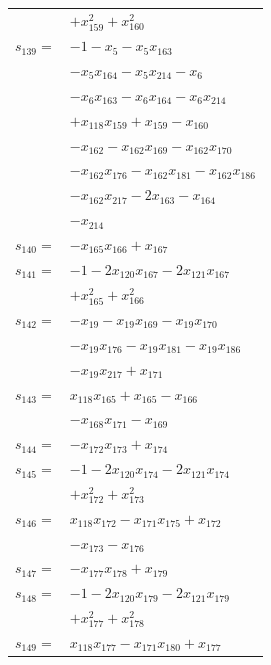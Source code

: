 \begin{longtable}{@{}r@{\;}l@{}}
 & \(\displaystyle +x_{159}^{2} +x_{160}^{2}\) \\[3pt]
\(s_{139}=\) & \(\displaystyle -1 -x_{5} -x_{5}x_{163}\) \\
 & \(\displaystyle -x_{5}x_{164} -x_{5}x_{214} -x_{6}\) \\
 & \(\displaystyle -x_{6}x_{163} -x_{6}x_{164} -x_{6}x_{214}\) \\
 & \(\displaystyle +x_{118}x_{159} +x_{159} -x_{160}\) \\
 & \(\displaystyle -x_{162} -x_{162}x_{169} -x_{162}x_{170}\) \\
 & \(\displaystyle -x_{162}x_{176} -x_{162}x_{181} -x_{162}x_{186}\) \\
 & \(\displaystyle -x_{162}x_{217} -2x_{163} -x_{164}\) \\
 & \(\displaystyle -x_{214}\) \\[3pt]
\(s_{140}=\) & \(\displaystyle -x_{165}x_{166} +x_{167}\) \\[3pt]
\(s_{141}=\) & \(\displaystyle -1 -2x_{120}x_{167} -2x_{121}x_{167}\) \\
 & \(\displaystyle +x_{165}^{2} +x_{166}^{2}\) \\[3pt]
\(s_{142}=\) & \(\displaystyle -x_{19} -x_{19}x_{169} -x_{19}x_{170}\) \\
 & \(\displaystyle -x_{19}x_{176} -x_{19}x_{181} -x_{19}x_{186}\) \\
 & \(\displaystyle -x_{19}x_{217} +x_{171}\) \\[3pt]
\(s_{143}=\) & \(\displaystyle x_{118}x_{165} +x_{165} -x_{166}\) \\
 & \(\displaystyle -x_{168}x_{171} -x_{169}\) \\[3pt]
\(s_{144}=\) & \(\displaystyle -x_{172}x_{173} +x_{174}\) \\[3pt]
\(s_{145}=\) & \(\displaystyle -1 -2x_{120}x_{174} -2x_{121}x_{174}\) \\
 & \(\displaystyle +x_{172}^{2} +x_{173}^{2}\) \\[3pt]
\(s_{146}=\) & \(\displaystyle x_{118}x_{172} -x_{171}x_{175} +x_{172}\) \\
 & \(\displaystyle -x_{173} -x_{176}\) \\[3pt]
\(s_{147}=\) & \(\displaystyle -x_{177}x_{178} +x_{179}\) \\[3pt]
\(s_{148}=\) & \(\displaystyle -1 -2x_{120}x_{179} -2x_{121}x_{179}\) \\
 & \(\displaystyle +x_{177}^{2} +x_{178}^{2}\) \\[3pt]
\(s_{149}=\) & \(\displaystyle x_{118}x_{177} -x_{171}x_{180} +x_{177}\) \\

\end{longtable}
